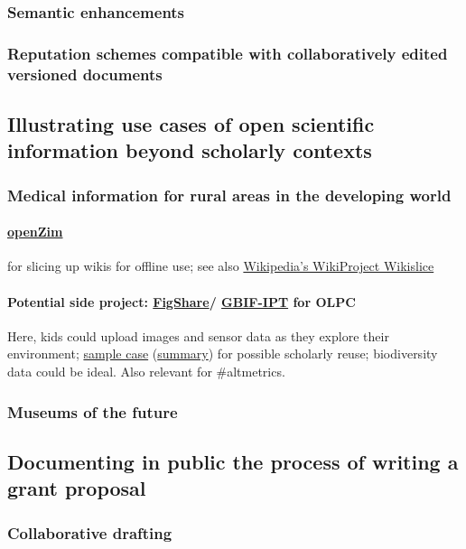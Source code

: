 \documentclass[final,authoryear,3p]{elsarticle-open-drafting}
\begin{document}
\subsubsection{Semantic enhancements}
\subsubsection{Reputation schemes compatible with collaboratively edited versioned documents}
\subsection{Illustrating use cases of open scientific information beyond scholarly contexts}
\subsubsection{Medical information for rural areas in the developing world}
\paragraph{\href{http://www.openzim.org}{openZim}} for slicing up wikis for offline use; see also \href{http://en.wikipedia.org/wiki/Wikipedia:WikiProject_Wikislice}{Wikipedia's WikiProject Wikislice}
\paragraph{Potential side project: \href{http://figshare.com/}{FigShare}/ \href{http://www.gbif.org/communications/news-and-events/showsingle/article/new-incentive-for-biodiversity-data-publishing/}{GBIF-IPT} for OLPC} 
Here, kids could upload images and sensor data as they explore their environment; \href{http://dx.doi.org/10.3897/zookeys.89.903}{sample case} (\href{http://www.eurekalert.org/pub_releases/2011-05/pp-snh051711.php}{summary}) for possible scholarly reuse; biodiversity data could be ideal. Also relevant for \#altmetrics.
\subsubsection{Museums of the future}
\subsection{Documenting in public the process of writing a grant proposal}
\subsubsection{Collaborative drafting}
\end{document}
